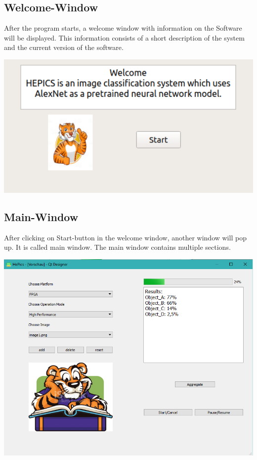 \documentclass[parskip=full]{scrartcl}
\begin{document}
\subsection {Welcome-Window}

After the program starts, a welcome window with information on the Software will be displayed. This information consists of a short description of the  system and the current version of the software.

\begin{center}
\includegraphics[width=1.0\textwidth]{images/WelcomeWindow.png}
\end{center}

\pagebreak



\subsection {Main-Window}

After clicking on Start-button in the welcome window, another window will pop up. It is called main window. The main window contains multiple sections.

\begin{center}
\includegraphics[width=1.0\textwidth]{images/NewMainWindow.png}
\end{center}
\end{document}
